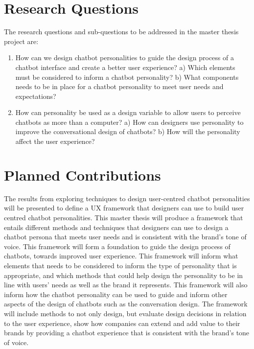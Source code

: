 \vspace{5mm} %

\section{Research Questions}
The research questions and sub-questions to be addressed in the master thesis project are:

\begin{enumerate}
    \item How can we design chatbot personalities to guide the design process of a chatbot interface and create a better user experience?
    \subitem a) Which elements must be considered to inform a chatbot personality?
    \subitem b) What components needs to be in place for a chatbot personality to meet user needs and expectations?
    \item How can personality be used as a design variable to allow users to perceive chatbots as more than a computer?
        \subitem a) How can designers use personality to improve the conversational design of chatbots?
        \subitem b) How will the personality affect the user experience?
        \end{enumerate}

\vspace{5mm} %

\section{Planned Contributions}
The results from exploring techniques to design user-centred chatbot personalities will be presented to define a UX framework that designers can use to build user centred chatbot personalities. This master thesis will produce a framework that entails different methods and techniques that designers can use to design a chatbot persona that meets user needs and is consistent with the brand's tone of voice. This framework will form a foundation to guide the design process of chatbots, towards improved user experience. This framework will inform what elements that needs to be considered to inform the type of personality that is appropriate, and which methods that could help design the personality to be in line with users' needs as well as the brand it represents. This framework will also inform how the chatbot personality can be used to guide and inform other aspects of the design of chatbots such as the conversation design. The framework will include methods to not only design, but evaluate design decisions in relation to the user experience, show how companies can extend and add value to their brands by providing a chatbot experience that is consistent with the brand's tone of voice.